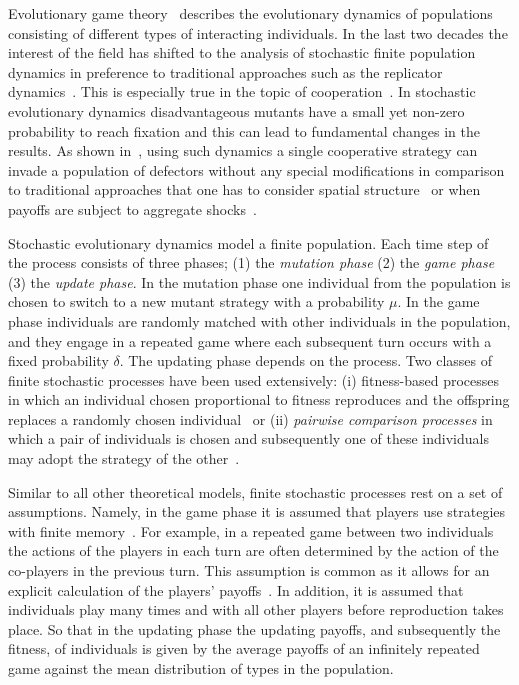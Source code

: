 \documentclass[11pt]{article}
\theoremstyle{plainCl1}
\theoremstyle{plainCl2}
\begin{document}
Evolutionary game theory~\cite{smith1982evolution, hofbauer1998evolutionary,
nowak:Nature:2004, hauert2005game} describes the evolutionary dynamics of
populations consisting of different types of interacting individuals. In the
last two decades the interest of the field has shifted to the analysis of
stochastic finite population dynamics in preference to traditional approaches
such as the replicator dynamics~\cite{hofbauer:JTB:1979, taylor:MATHBIO:1978}.
This is especially true in the topic of cooperation~\cite{hilbe:PNAS:2013,
hilbe:Nature:2018,glynatsi:SCR:2020}. In stochastic evolutionary dynamics
disadvantageous mutants have a small yet non-zero probability to reach fixation
and this can lead to fundamental changes in the results. As shown
in~\cite{nowak:Nature:2004}, using such dynamics a single cooperative strategy
can invade a population of defectors without any special modifications in
comparison to traditional approaches that one has to consider spatial
structure~\cite{nowak:Nature:1992} or when payoffs are subject to aggregate
shocks~\cite{fudenberg:JET:1992}.

Stochastic evolutionary dynamics model a finite population. Each
time step of the process consists of three phases; (1) the \textit{mutation
phase} (2) the \textit{game phase} (3) the \textit{update phase}. In the
mutation phase one individual from the population is chosen to switch to a new
mutant strategy with a probability \(\mu\). In the game phase individuals are
randomly matched with other individuals in the population, and they engage in a
repeated game where each subsequent turn occurs with a fixed probability
\(\delta\). The updating phase depends on the process. Two classes of
finite stochastic processes have been used extensively: (i) fitness-based
processes in which an individual chosen proportional to fitness reproduces and
the offspring replaces a randomly chosen individual~\cite{nowak:Nature:2004} or
(ii) \textit{pairwise comparison processes} in which a pair of individuals is
chosen and subsequently one of these individuals may adopt the strategy of the
other~\cite{traulsen2007pairwise}.

Similar to all other theoretical models, finite stochastic processes rest on a
set of assumptions. Namely, in the game phase it is assumed that players use
strategies with finite memory~\cite{Nowak1992tit, Baek2016}. For example, in a
repeated game between two individuals the actions of the players in each turn
are often determined by the action of the co-players in the previous turn. This
assumption is common as it allows for an explicit calculation of the players'
payoffs~\cite{sigmund2010calculus}. In addition, it is
assumed that individuals play many times and with all other players before
reproduction takes place. So that in the updating phase the updating payoffs, and
subsequently the fitness, of individuals is given by the average payoffs of an
infinitely repeated game against the mean distribution of types in the
population.
\end{document}
